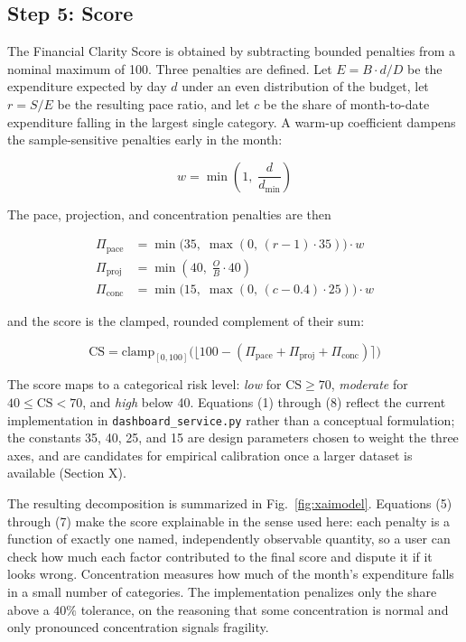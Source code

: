\documentclass[conference]{IEEEtran}
\begin{document}
\subsection{Step 5: Score}

The Financial Clarity Score is obtained by subtracting bounded penalties from a nominal maximum of 100. Three penalties are defined. Let $E = B \cdot d / D$ be the expenditure expected by day $d$ under an even distribution of the budget, let $r = S/E$ be the resulting pace ratio, and let $c$ be the share of month-to-date expenditure falling in the largest single category. A warm-up coefficient dampens the sample-sensitive penalties early in the month:

\begin{equation}
w = \min\!\left(1,\; \frac{d}{d_{\min}}\right)
\end{equation}

The pace, projection, and concentration penalties are then

\begin{align}
\Pi_{\text{pace}} &= \min\big(35,\; \max(0,\, (r - 1)\cdot 35)\big) \cdot w \\
\Pi_{\text{proj}} &= \min\!\left(40,\; \frac{O}{B}\cdot 40\right) \\
\Pi_{\text{conc}} &= \min\big(15,\; \max(0,\, (c - 0.4)\cdot 25)\big) \cdot w
\end{align}

and the score is the clamped, rounded complement of their sum:

\begin{equation}
\mathrm{CS} = \mathrm{clamp}_{[0,100]}\Big(\big\lfloor 100 - (\Pi_{\text{pace}} + \Pi_{\text{proj}} + \Pi_{\text{conc}}) \big\rceil\Big)
\end{equation}

The score maps to a categorical risk level: \emph{low} for $\mathrm{CS} \geq 70$, \emph{moderate} for $40 \leq \mathrm{CS} < 70$, and \emph{high} below 40. Equations (1) through (8) reflect the current implementation in \texttt{dashboard\_service.py} rather than a conceptual formulation; the constants 35, 40, 25, and 15 are design parameters chosen to weight the three axes, and are candidates for empirical calibration once a larger dataset is available (Section X).

The resulting decomposition is summarized in Fig.~\ref{fig:xaimodel}. Equations (5) through (7) make the score explainable in the sense used here: each penalty is a function of exactly one named, independently observable quantity, so a user can check how much each factor contributed to the final score and dispute it if it looks wrong. Concentration measures how much of the month's expenditure falls in a small number of categories. The implementation penalizes only the share above a $40\%$ tolerance, on the reasoning that some concentration is normal and only pronounced concentration signals fragility.
\end{document}
